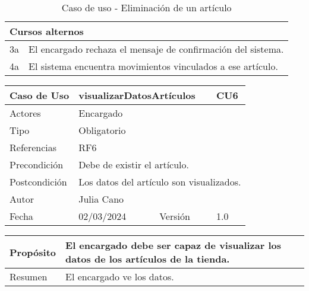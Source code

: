 \begin{table}[H]
	\centering
	\begin{tabular}{| m{} | m{} | m{} | m{} |}
		\hline
		\multicolumn{4}{|m{0.9\textwidth}|}{Cursos alternos}     \\ 
		\hline
		3a & \multicolumn{3}{m{0.67\textwidth}|}{El encargado rechaza el mensaje de confirmación del sistema.} \\ 
		\hline
		4a & \multicolumn{3}{m{0.67\textwidth}|}{El sistema encuentra movimientos vinculados a ese artículo.} \\ 
		\hline
	\end{tabular}
	\caption{Caso de uso - Eliminación de un artículo}
\end{table}

\newpage


\begin{table}[H]
	\centering
	\begin{tabular}{| m{} | m{} | m{} | m{} |}
		\hline
		\rowcolor{grayshade} Caso de Uso & \multicolumn{2}{|m{0.43\textwidth}|}{visualizarDatosArtículos} &  CU6\\ 
		\hline
		Actores & \multicolumn{3}{l|}{Encargado} \\ 
		\hline
		Tipo & \multicolumn{3}{l|}{Obligatorio} \\ 
		\hline
		Referencias & \multicolumn{3}{l|}{RF6} \\ 
		\hline
		Precondición & \multicolumn{3}{m{0.67\textwidth}|}{Debe de existir el artículo.} \\ 
		\hline
		Postcondición & \multicolumn{3}{l|}{Los datos del artículo son visualizados.} \\ 
		\hline
		Autor & \multicolumn{3}{l|}{Julia Cano} \\ 
		\hline
		Fecha & 02/03/2024 & Versión & 1.0 \\
		\hline
	\end{tabular}
\end{table}

\begin{table}[H]
	\centering
	\begin{tabular}{| m{} | m{} | m{} | m{} |}
		\hline
		Propósito & \multicolumn{3}{m{0.67\textwidth}|}{El encargado debe ser capaz de visualizar los datos de los artículos de la tienda.}   \\ 
		\hline
		Resumen & \multicolumn{3}{m{0.67\textwidth}|}{El encargado ve los datos.} \\ 
		\hline
	\end{tabular}
\end{table}


